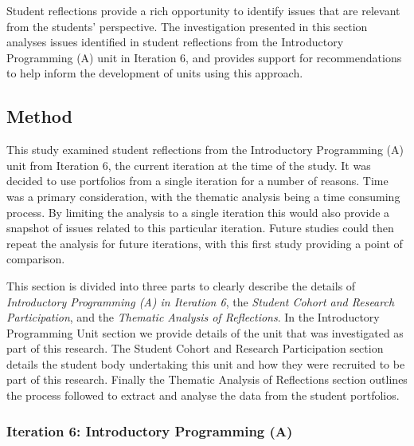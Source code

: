 Student reflections provide a rich opportunity to identify issues that are relevant from the students' perspective. The investigation presented in this section analyses issues identified in student reflections from the Introductory Programming (A) unit in Iteration 6, and provides support for recommendations to help inform the development of units using this approach. 


\subsection{Method} %
\label{sub:issues_method}

This study examined student reflections from the Introductory Programming (A) unit from Iteration 6, the current iteration at the time of the study. It was decided to use portfolios from a single iteration for a number of reasons. Time was a primary consideration, with the thematic analysis being a time consuming process. By limiting the analysis to a single iteration this would also provide a snapshot of issues related to this particular iteration. Future studies could then repeat the analysis for future iterations, with this first study providing a point of comparison.

This section is divided into three parts to clearly describe the details of \emph{Introductory Programming (A) in Iteration 6}, the \emph{Student Cohort and Research Participation}, and the \emph{Thematic Analysis of Reflections}. In the Introductory Programming Unit section we provide details of the unit that was investigated as part of this research. The Student Cohort and Research Participation section details the student body undertaking this unit and how they were recruited to be part of this research. Finally the Thematic Analysis of Reflections section outlines the process followed to extract and analyse the data from the student portfolios.

\subsubsection{Iteration 6: Introductory Programming (A)} %
\label{sub:intro_prog_i6}

